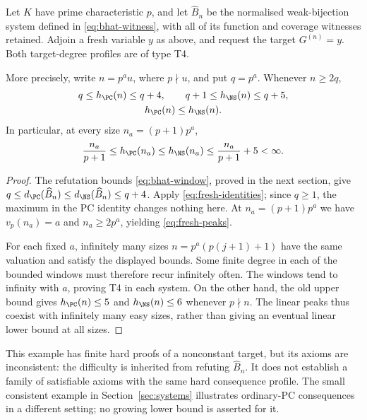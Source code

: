 \begin{corollary}\label{cor:fresh-peaks}
Let $K$ have prime characteristic $p$, and let $\widehat B_n$ be the
normalised weak-bijection system defined in
\eqref{eq:bhat-witness}, with all of its function and coverage witnesses
retained. Adjoin a fresh variable $y$ as above, and request the target
$G^{(n)}=y$. Both target-degree profiles are of type T4.

More precisely, write $n=p^a u$, where $p\nmid u$, and put $q=p^a$.
Whenever $n\ge2q$,
\[
 \begin{gathered}
 q\le h_{\PC}(n)\le q+4,\qquad
 q+1\le h_{\NS}(n)\le q+5,\\
                         h_{\PC}(n)\le h_{\NS}(n).
 \end{gathered}
\]
In particular, at every size $n_a=(p+1)p^a$,
\begin{equation}\label{eq:fresh-peaks}
 \frac{n_a}{p+1}\le h_{\PC}(n_a)\le h_{\NS}(n_a)
                              \le\frac{n_a}{p+1}+5<\infty.
\end{equation}
\end{corollary}
\begin{proof}
The refutation bounds \eqref{eq:bhat-window}, proved in the next
section, give
$q\le d_{\PC}(\widehat B_n)\le d_{\NS}(\widehat B_n)\le q+4$.
Apply \eqref{eq:fresh-identities}; since $q\ge1$, the maximum in the
PC identity changes nothing here. At $n_a=(p+1)p^a$ we have
$v_p(n_a)=a$ and $n_a\ge2p^a$, yielding \eqref{eq:fresh-peaks}.

For each fixed $a$, infinitely many sizes
$n=p^a(p(j+1)+1)$ have the same valuation and satisfy the displayed
bounds. Some finite degree in each of the bounded windows must
therefore recur infinitely often. The windows tend to infinity with
$a$, proving T4 in each system. On the other hand, the old upper
bound gives $h_{\PC}(n)\le5$ and $h_{\NS}(n)\le6$ whenever
$p\nmid n$. The linear peaks thus coexist with infinitely many easy
sizes, rather than giving an eventual linear lower bound at all sizes.
\end{proof}

This example has finite hard proofs of a nonconstant target, but its
axioms are inconsistent: the difficulty is inherited from refuting
$\widehat B_n$. It does not establish a family of satisfiable axioms
with the same hard consequence profile. The small consistent example
in Section~\ref{sec:systems} illustrates ordinary-PC consequences in
a different setting; no growing lower bound is asserted for it.
